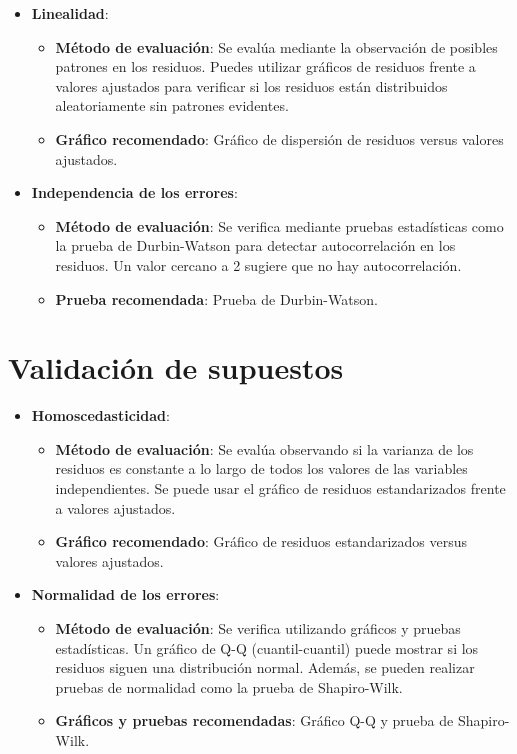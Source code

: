 \documentclass[
  letterpaper,
  DIV=11,
  numbers=noendperiod]{scrreprt}
\providecommand{\tightlist}{%
  \setlength{\itemsep}{0pt}\setlength{\parskip}{0pt}}\usepackage{longtable,booktabs,array}
\begin{document}
\begin{itemize}
\tightlist
\item
  \textbf{Linealidad}:

  \begin{itemize}
  \tightlist
  \item
    \textbf{Método de evaluación}: Se evalúa mediante la observación de
    posibles patrones en los residuos. Puedes utilizar gráficos de
    residuos frente a valores ajustados para verificar si los residuos
    están distribuidos aleatoriamente sin patrones evidentes.
  \item
    \textbf{Gráfico recomendado}: Gráfico de dispersión de residuos
    versus valores ajustados.
  \end{itemize}
\item
  \textbf{Independencia de los errores}:

  \begin{itemize}
  \tightlist
  \item
    \textbf{Método de evaluación}: Se verifica mediante pruebas
    estadísticas como la prueba de Durbin-Watson para detectar
    autocorrelación en los residuos. Un valor cercano a 2 sugiere que no
    hay autocorrelación.
  \item
    \textbf{Prueba recomendada}: Prueba de Durbin-Watson.
  \end{itemize}
\end{itemize}

\section{Validación de supuestos}\label{validaciuxf3n-de-supuestos-1}

\begin{itemize}
\tightlist
\item
  \textbf{Homoscedasticidad}:

  \begin{itemize}
  \tightlist
  \item
    \textbf{Método de evaluación}: Se evalúa observando si la varianza
    de los residuos es constante a lo largo de todos los valores de las
    variables independientes. Se puede usar el gráfico de residuos
    estandarizados frente a valores ajustados.
  \item
    \textbf{Gráfico recomendado}: Gráfico de residuos estandarizados
    versus valores ajustados.
  \end{itemize}
\item
  \textbf{Normalidad de los errores}:

  \begin{itemize}
  \tightlist
  \item
    \textbf{Método de evaluación}: Se verifica utilizando gráficos y
    pruebas estadísticas. Un gráfico de Q-Q (cuantil-cuantil) puede
    mostrar si los residuos siguen una distribución normal. Además, se
    pueden realizar pruebas de normalidad como la prueba de
    Shapiro-Wilk.
  \item
    \textbf{Gráficos y pruebas recomendadas}: Gráfico Q-Q y prueba de
    Shapiro-Wilk.
  \end{itemize}
\end{itemize}
\end{document}
